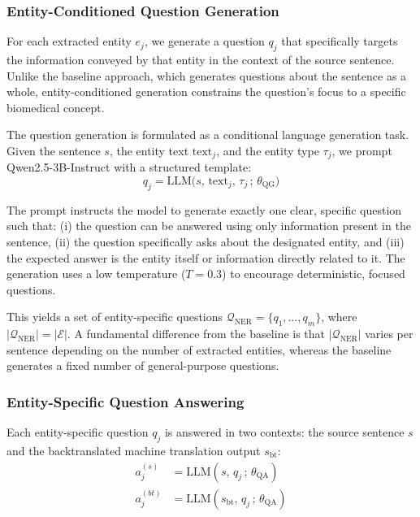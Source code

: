 \subsubsection{Entity-Conditioned Question Generation}

For each extracted entity $e_j$, we generate a question $q_j$ that specifically targets the information conveyed by that entity in the context of the source sentence. Unlike the baseline approach, which generates questions about the sentence as a whole, entity-conditioned generation constrains the question's focus to a specific biomedical concept.

The question generation is formulated as a conditional language generation task. Given the sentence $s$, the entity text $\text{text}_j$, and the entity type $\tau_j$, we prompt Qwen2.5-3B-Instruct with a structured template:
\begin{equation}
    q_j = \text{LLM}\big(s, \, \text{text}_j, \, \tau_j \,;\, \theta_{\text{QG}}\big)
\end{equation}

The prompt instructs the model to generate exactly one clear, specific question such that: (i) the question can be answered using only information present in the sentence, (ii) the question specifically asks about the designated entity, and (iii) the expected answer is the entity itself or information directly related to it. The generation uses a low temperature ($T = 0.3$) to encourage deterministic, focused questions.

This yields a set of entity-specific questions $\mathcal{Q}_{\text{NER}} = \{q_1, \ldots, q_m\}$, where $|\mathcal{Q}_{\text{NER}}| = |\mathcal{E}|$. A fundamental difference from the baseline is that $|\mathcal{Q}_{\text{NER}}|$ varies per sentence depending on the number of extracted entities, whereas the baseline generates a fixed number of general-purpose questions.

\subsubsection{Entity-Specific Question Answering}

Each entity-specific question $q_j$ is answered in two contexts: the source sentence $s$ and the backtranslated machine translation output $s_{\text{bt}}$:
\begin{align}
    a_j^{(s)} &= \text{LLM}(s, \, q_j \,;\, \theta_{\text{QA}}) \\
    a_j^{(bt)} &= \text{LLM}(s_{\text{bt}}, \, q_j \,;\, \theta_{\text{QA}})
\end{align}

